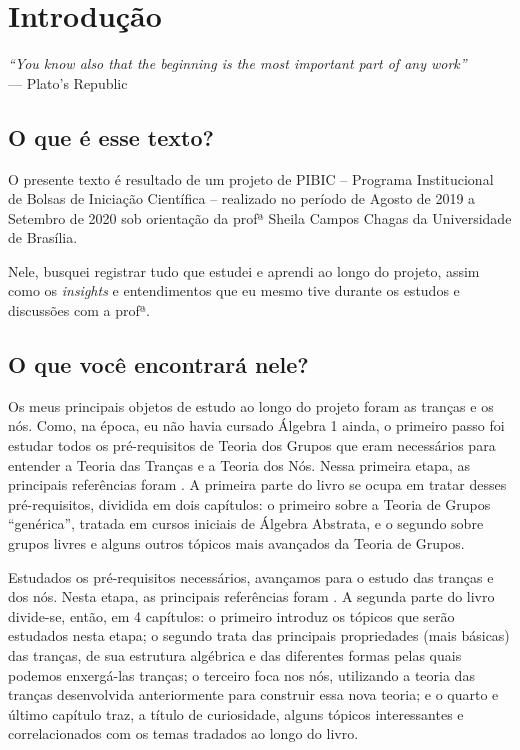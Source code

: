 \chapter*{Introdução}
%
\hfill%
\begin{minipage}{10cm}
\begin{flushright}
\rightskip=0.5cm
\textit{``You know also that the beginning is the most important part of any work''}
\\[0.1cm]
\rightskip=0.5cm
--- Plato's Republic
\end{flushright}
\end{minipage}

\section*{O que é esse texto?}

    O presente texto é resultado de um projeto de PIBIC -- 
    Programa Institucional de Bolsas de Iniciação Científica --
    realizado no período de Agosto de 2019 a Setembro de 2020
    sob orientação da profª Sheila Campos Chagas da Universidade
    de Brasília.
    
    Nele, busquei registrar tudo que estudei e aprendi ao
    longo do projeto, assim como os {\it insights} e
    entendimentos que eu mesmo tive durante os estudos e 
    discussões com a profª.
    
\section*{O que você encontrará nele?}

    Os meus principais objetos de estudo ao longo do projeto
    foram as tranças e os nós. Como, na época, eu não havia cursado
    Álgebra 1 ainda, o primeiro passo foi estudar todos os 
    pré-requisitos de Teoria dos Grupos que eram necessários
    para entender a Teoria das Tranças e a Teoria dos Nós.
    Nessa primeira etapa, as principais referências foram
    \cite{Livro-do-Fraleigh, Gallian}. A primeira parte do
    livro se ocupa em tratar desses pré-requisitos, dividida
    em dois capítulos: o primeiro sobre a Teoria de Grupos
    ``genérica'', tratada em cursos iniciais de Álgebra Abstrata,
    e o segundo sobre grupos livres e alguns outros tópicos
    mais avançados da Teoria de Grupos.
    
    Estudados os pré-requisitos necessários, avançamos
    para o estudo das tranças e dos nós. Nesta etapa,
    as principais referências foram 
    \cite{knot-book, Livro-do-Margalit, Livro-do-Kunio}.
    A segunda parte do livro divide-se, então, em 4 capítulos:
    o primeiro introduz os tópicos que serão estudados nesta etapa;
    o segundo trata das principais propriedades (mais básicas)
    das tranças, de sua estrutura algébrica e das diferentes formas
    pelas quais podemos enxergá-las tranças;
    o terceiro foca nos nós, utilizando a teoria das tranças
    desenvolvida anteriormente para construir essa nova teoria;
    e o quarto e último capítulo traz, a título de curiosidade, 
    alguns tópicos interessantes e correlacionados com os temas
    tradados ao longo do livro.
    
